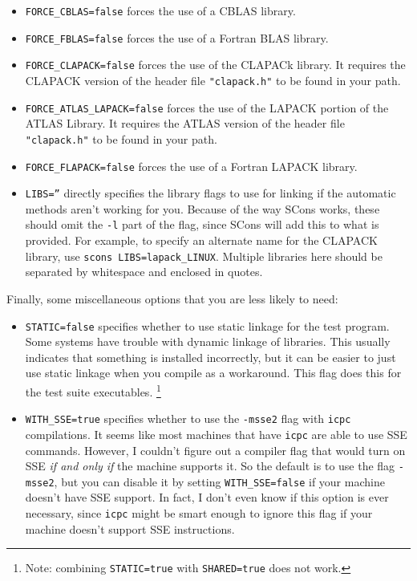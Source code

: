 \begin{enumerate}
\begin{itemize}
\item \texttt{FORCE\_CBLAS=false} forces the use of a CBLAS library.
\item \texttt{FORCE\_FBLAS=false} forces the use of a Fortran BLAS library.
\item \texttt{FORCE\_CLAPACK=false} forces the use of the CLAPACk library. 
It requires the CLAPACK version of the header file \texttt{"clapack.h"} to be found in your path.
\item \texttt{FORCE\_ATLAS\_LAPACK=false} forces the use of the LAPACK portion
of the ATLAS Library.  
It requires the ATLAS version of the header file \texttt{"clapack.h"} to be found in your path.
\item \texttt{FORCE\_FLAPACK=false} forces the use of a Fortran LAPACK library.
\item \texttt{LIBS=''} directly specifies the library flags to use for linking if the automatic methods aren't working for you.  Because of the way SCons works,
these should omit the \texttt{-l} part of the flag, since SCons will add this to what is provided.
For example, to specify an alternate name for the CLAPACK library, use 
\texttt{scons LIBS=lapack\_LINUX}.  Multiple libraries here should be separated by 
whitespace and enclosed in quotes.
\end{itemize}
Finally, some miscellaneous options that you are less likely to need:
\begin{itemize}
\item \texttt{STATIC=false} specifies whether to use static linkage for the test program.  Some systems have trouble with
dynamic linkage of libraries.  This usually indicates that something is installed incorrectly, but
it can be easier to just use static linkage when you compile as a workaround.  This flag does this
for the test suite executables.  \footnote{Note: combining \texttt{STATIC=true} with \texttt{SHARED=true} does not work.}
\item \texttt{WITH\_SSE=true} specifies whether to use the \texttt{-msse2} flag with \texttt{icpc} compilations. 
It seems like most machines that have \texttt{icpc} are able to use SSE commands.  However, 
I couldn't figure out a compiler flag that would turn on SSE {\em if and only if} the machine
supports it.  So the default is to use the flag \texttt{-msse2}, but you can disable it by setting 
\texttt{WITH\_SSE=false} if your machine doesn't have SSE support.  In fact, I don't even know if this option is ever necessary, since \texttt{icpc} might be smart enough to ignore this flag if your machine doesn't support SSE instructions.

\end{itemize}
\end{enumerate}
